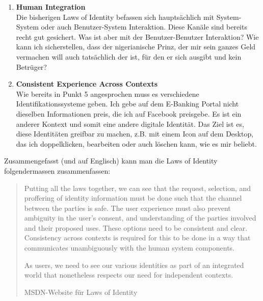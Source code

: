 \documentclass[a4paper, 11pt]{article}
\begin{document}
\begin{enumerate}
			Es macht keinen Sinn, sich mit der AHV-Nummer beim Geschäfts-PC einloggen zu können. Denn der Staat hat Informationen über mich, die den Arbeitgeber vermutlich nichts angehen. Das heisst, für verschiedene Dinge sollten unterschiedliche Identifikationssysteme mit unterschiedlichen Features verwendet werden.
	\item \textbf{Human Integration}\\
			Die bisherigen Laws of Identity befassen sich hauptsächlich mit System-System oder auch Benutzer-System Interaktion. Diese Kanäle sind bereits recht gut gesichert. Was ist aber mit der Benutzer-Benutzer Interaktion? Wie kann ich sicherstellen, dass der nigerianische Prinz, der mir sein ganzes Geld vermachen will auch tatsächlich der ist, für den er sich ausgibt und kein Betrüger?
	\item \textbf{Consistent Experience Across Contexts}\\
			Wie bereits in Punkt 5 angesprochen muss es verschiedene Identifikationssysteme geben. Ich gebe auf dem E-Banking Portal nicht dieselben Informationen preis, die ich auf Facebook preisgebe. Es ist ein anderer Kontext und somit eine andere digitale Identität. Das Ziel ist es, diese Identitäten greifbar zu machen, z.B. mit einem Icon auf dem Desktop, das ich doppelklicken, bearbeiten oder auch löschen kann, wie es mir beliebt.
\end{enumerate}

\noindent Zusammengefasst (und auf Englisch) kann man die Laws of Identity folgendermassen zusammenfassen:

\blockquote[MSDN-Website für Laws of Identity]{Putting all the laws together, we can see that the request, selection, and proffering of identity information must be done such that the channel between the parties is safe. The user experience must also prevent ambiguity in the user's consent, and understanding of the parties involved and their proposed uses. These options need to be consistent and clear. Consistency across contexts is required for this to be done in a way that communicates unambiguously with the human system components.
	
As users, we need to see our various identities as part of an integrated world that nonetheless respects our need for independent contexts.}
\end{document}
